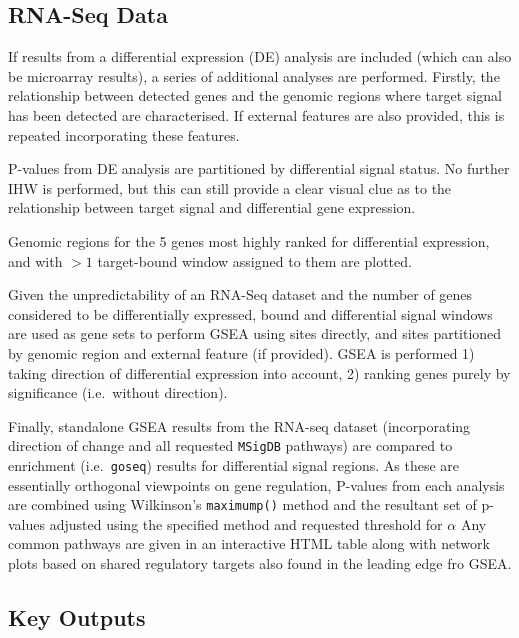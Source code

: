 \documentclass[
]{book}
\begin{document}
\hypertarget{rna-seq-data}{%
\subsection*{RNA-Seq Data}\label{rna-seq-data}}

If results from a differential expression (DE) analysis are included (which can also be microarray results), a series of additional analyses are performed.
Firstly, the relationship between detected genes and the genomic regions where target signal has been detected are characterised.
If external features are also provided, this is repeated incorporating these features.

P-values from DE analysis are partitioned by differential signal status.
No further IHW is performed, but this can still provide a clear visual clue as to the relationship between target signal and differential gene expression.

Genomic regions for the 5 genes most highly ranked for differential expression, and with \(>1\) target-bound window assigned to them are plotted.

Given the unpredictability of an RNA-Seq dataset and the number of genes considered to be differentially expressed, bound and differential signal windows are used as gene sets to perform GSEA\citep{fgsea} using sites directly, and sites partitioned by genomic region and external feature (if provided).
GSEA is performed 1) taking direction of differential expression into account, 2) ranking genes purely by significance (i.e.~without direction).

Finally, standalone GSEA results from the RNA-seq dataset (incorporating direction of change and all requested \texttt{MSigDB} pathways) are compared to enrichment (i.e.~\texttt{goseq}) results for differential signal regions.
As these are essentially orthogonal viewpoints on gene regulation, P-values from each analysis are combined using Wilkinson's \texttt{maximump()} method and the resultant set of p-values adjusted using the specified method and requested threshold for \(\alpha\)
Any common pathways are given in an interactive HTML table along with network plots based on shared regulatory targets also found in the leading edge fro GSEA.

\hypertarget{key-outputs-1}{%
\subsection*{Key Outputs}\label{key-outputs-1}}
\end{document}
